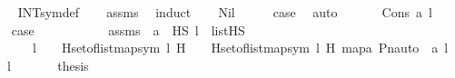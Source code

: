 \begin{isabellebody}
%
\isadelimproof
\isanewline
\ \ %
\endisadelimproof
%
\isatagproof
{}\isamarkupfalse%
\ INTsym{\isacharunderscore}{\kern0pt}def\isanewline
\ \ \isamarkupfalse%
\ assms\ \isanewline
{}\isamarkupfalse%
\ {\isacharparenleft}{\kern0pt}induct{\isacharparenright}{\kern0pt}\isanewline
\ \ \isamarkupfalse%
\ Nil\isanewline
\ \ \isamarkupfalse%
\ \isamarkupfalse%
\ {\isacharquery}{\kern0pt}case\ \isamarkupfalse%
\ auto\ \isanewline
{}\isamarkupfalse%
\ \isanewline
\ \ \isamarkupfalse%
\ {\isacharparenleft}{\kern0pt}Cons\ a\ l{\isacharparenright}{\kern0pt}\isanewline
\ \ \isamarkupfalse%
\ \isamarkupfalse%
\ {\isacharquery}{\kern0pt}case\isanewline
\ \ \isamarkupfalse%
\ {\isacharminus}{\kern0pt}\ \isanewline
\ \ \ \ \isamarkupfalse%
\ assms\ {\isacharcolon}{\kern0pt}\ {\isachardoublequoteopen}a\ {\isasymin}\ HS{\isachardoublequoteclose}\ {\isachardoublequoteopen}l\ {\isasymin}\ list{\isacharparenleft}{\kern0pt}HS{\isacharparenright}{\kern0pt}{\isachardoublequoteclose}\isanewline
\ \ \ \ \ \ {\isachardoublequoteopen}{\isacharparenleft}{\kern0pt}l\ {\isasymnoteq}\ {\isacharbrackleft}{\kern0pt}{\isacharbrackright}{\kern0pt}\ {\isasymLongrightarrow}\ {\isacharparenleft}{\kern0pt}{\isasymInter}H{\isasymin}set{\isacharunderscore}{\kern0pt}of{\isacharunderscore}{\kern0pt}list{\isacharparenleft}{\kern0pt}map{\isacharparenleft}{\kern0pt}sym{\isacharcomma}{\kern0pt}\ l{\isacharparenright}{\kern0pt}{\isacharparenright}{\kern0pt}{\isachardot}{\kern0pt}\ H{\isacharparenright}{\kern0pt}\ {\isasymin}\ {\isasymF}\ {\isasymand}\ {\isacharparenleft}{\kern0pt}{\isasymforall}{\isasympi}{\isasymin}{\isasymInter}H{\isasymin}set{\isacharunderscore}{\kern0pt}of{\isacharunderscore}{\kern0pt}list{\isacharparenleft}{\kern0pt}map{\isacharparenleft}{\kern0pt}sym{\isacharcomma}{\kern0pt}\ l{\isacharparenright}{\kern0pt}{\isacharparenright}{\kern0pt}{\isachardot}{\kern0pt}\ H{\isachardot}{\kern0pt}\ map{\isacharparenleft}{\kern0pt}{\isasymlambda}a{\isachardot}{\kern0pt}\ Pn{\isacharunderscore}{\kern0pt}auto{\isacharparenleft}{\kern0pt}{\isasympi}{\isacharparenright}{\kern0pt}\ {\isacharbackquote}{\kern0pt}\ a{\isacharcomma}{\kern0pt}\ l{\isacharparenright}{\kern0pt}\ {\isacharequal}{\kern0pt}\ l{\isacharparenright}{\kern0pt}{\isacharparenright}{\kern0pt}{\isachardoublequoteclose}\ \isanewline
\ \ \ \ \isamarkupfalse%
\ {\isacharquery}{\kern0pt}thesis\ \isanewline

\end{isabellebody}
